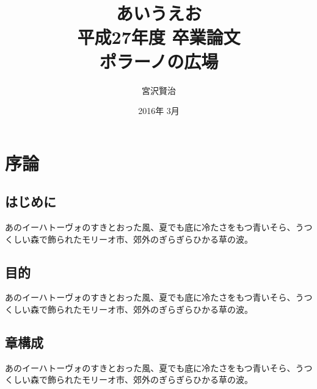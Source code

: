 \documentclass[uplatex,report]{jsbook}
\begin{document}
\title{あいうえお\\
平成27年度 卒業論文\\
ポラーノの広場}
\author{宮沢賢治}
\date{2016年 3月}
\maketitle
\chapter{序論}
\section{はじめに}
あのイーハトーヴォのすきとおった風、夏でも底に冷たさをもつ青いそら、うつくしい森で飾られたモリーオ市、郊外のぎらぎらひかる草の波。
\section{目的}
あのイーハトーヴォのすきとおった風、夏でも底に冷たさをもつ青いそら、うつくしい森で飾られたモリーオ市、郊外のぎらぎらひかる草の波。
\section{章構成}
あのイーハトーヴォのすきとおった風、夏でも底に冷たさをもつ青いそら、うつくしい森で飾られたモリーオ市、郊外のぎらぎらひかる草の波。
\end{document}
